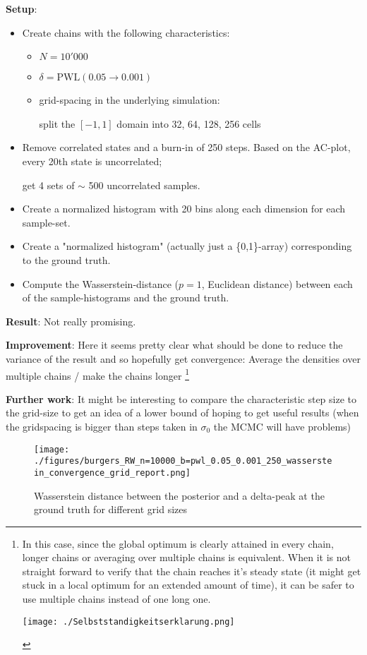 \documentclass[11pt]{article}
\begin{document}
\begin{enumerate}
\textbf{Setup}:
\begin{itemize}
\item Create chains with the following characteristics:
\begin{itemize}
\item \(N = 10'000\)
\item \(\delta = \text{PWL}(0.05 \to 0.001)\)
\item grid-spacing in the underlying simulation:

split the \([-1, 1]\) domain into 32, 64, 128, 256 cells
\end{itemize}

\item Remove correlated states and a burn-in of 250 steps.
Based on the AC-plot, every 20th state is uncorrelated;

get 4 sets of \(\sim\) 500 uncorrelated samples.

\item Create a normalized histogram with 20 bins along each dimension for each sample-set.

\item Create a "normalized histogram" (actually just a \{0,1\}-array) corresponding to the
ground truth.

\item Compute the Wasserstein-distance (\(p=1\), Euclidean distance) between each of the sample-histograms
and the ground truth.
\end{itemize}

\textbf{Result}: Not really promising.

\textbf{Improvement}: Here it seems pretty clear what should be done to reduce the variance of the result
and so hopefully get convergence: Average the densities over multiple chains / make the chains longer \footnote{In this case, since the global optimum is clearly attained in every chain, longer chains or
averaging over multiple chains is equivalent. When it is not straight forward to verify that the chain
reaches it's steady state (it might get stuck in a local optimum for an extended amount of time), it can
be safer to use multiple chains instead of one long one.




\begin{center}
\texttt{[image: ./Selbststandigkeitserklarung.png]}
\end{center}}

\textbf{Further work}: It might be interesting to compare the characteristic step size to the grid-size
to get an idea of a lower bound of hoping to get useful results (when the gridspacing is
bigger than steps taken in \(\sigma_0\) the MCMC will have problems)

\begin{figure}[htbp]
\centering
\texttt{[image: ./figures/burgers\_RW\_n=10000\_b=pwl\_0.05\_0.001\_250\_wasserstein\_convergence\_grid\_report.png]}
\caption{\label{fig:wasserstein_grid}
Wasserstein distance between the posterior and a delta-peak at the ground truth for different grid sizes}
\end{figure}
\end{enumerate}
\end{document}
